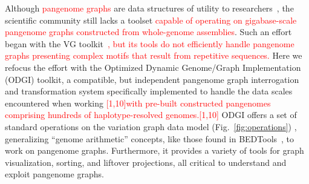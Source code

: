 \documentclass{bioinfo}
\newcommand{\REVIEWED}[1]{{\textcolor{Red}{#1}}}
\begin{document}
Although \REVIEWED{pangenome graphs} are data structures of utility to researchers~\citep{cpang2018,Garrison:2018,Baaijens_2019,Hickey:2020,Sibbesen_2021}, the scientific community still lacks a toolset \REVIEWED{capable of operating on gigabase-scale pangenome graphs constructed from whole-genome assemblies}.
Such an effort began with the VG toolkit~\citep{Garrison:2018}\REVIEWED{, but its tools do not efficiently handle pangenome graphs presenting complex motifs that result from repetitive sequences.}
Here we refocus the effort with the Optimized Dynamic Genome/Graph Implementation (ODGI) toolkit, a compatible, but independent pangenome graph interrogation and transformation system specifically implemented to handle the data scales encountered when working \REVIEWED{[1,10]with pre-built constructed pangenomes comprising hundreds of haplotype-resolved genomes.[1,10]}
ODGI offers a set of standard operations on the variation graph data model (Fig.~\ref{fig:operations}) , generalizing ``genome arithmetic'' concepts, like those found in BEDTools~\citep{Quinlan_2010}, to work on pangenome graphs.
Furthermore, it provides a variety of tools for graph visualization, sorting, and liftover projections, all critical to understand and exploit pangenome graphs.


\end{document}
